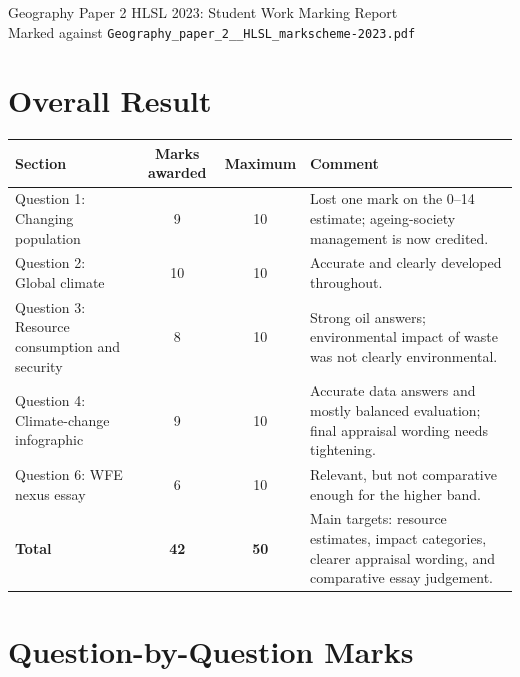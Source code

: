 \documentclass[11pt]{article}
\begin{document}
\begin{center}
  {\Large Geography Paper 2 HLSL 2023: Student Work Marking Report}\\[4pt]
  {\normalsize Marked against \texttt{Geography\_paper\_2\_\_HLSL\_markscheme-2023.pdf}}
\end{center}

\section*{Overall Result}

\begin{tabularx}{\textwidth}{@{}p{} c c Y@{}}
\toprule
Section & Marks awarded & Maximum & Comment \\
\midrule
Question 1: Changing population & 9 & 10 & Lost one mark on the 0--14 estimate; ageing-society management is now credited. \\
Question 2: Global climate & 10 & 10 & Accurate and clearly developed throughout. \\
Question 3: Resource consumption and security & 8 & 10 & Strong oil answers; environmental impact of waste was not clearly environmental. \\
Question 4: Climate-change infographic & 9 & 10 & Accurate data answers and mostly balanced evaluation; final appraisal wording needs tightening. \\
Question 6: WFE nexus essay & 6 & 10 & Relevant, but not comparative enough for the higher band. \\
\midrule
\textbf{Total} & \textbf{42} & \textbf{50} & Main targets: resource estimates, impact categories, clearer appraisal wording, and comparative essay judgement. \\
\bottomrule
\end{tabularx}

\section*{Question-by-Question Marks}
\end{document}
